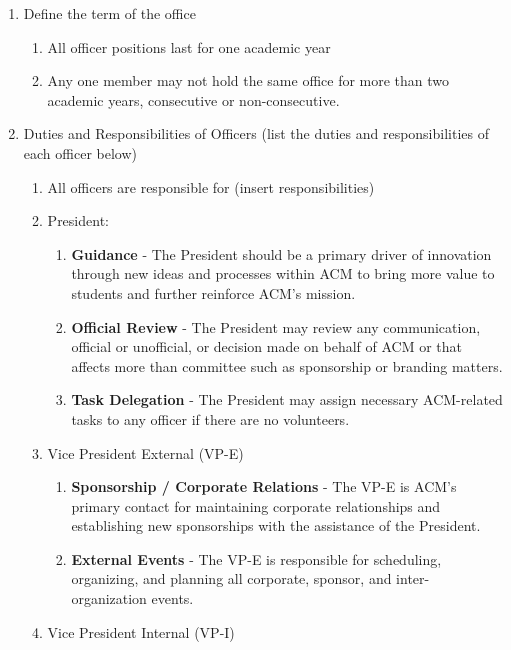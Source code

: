 \begin{enumerate}[label=\Alph*.]
  \item Define the term of the office
    \begin{enumerate}[label=\arabic*.]
      \item All officer positions last for one academic year
      \item Any one member may not hold the same office for more than two
      academic years, consecutive or non-consecutive.
    \end{enumerate}
  \item Duties and Responsibilities of Officers (list the duties and
  responsibilities of each officer below)
    \begin{enumerate}[label=\arabic*.]
      \item All officers are responsible for (insert responsibilities)
      \item President:
        \begin{enumerate}[label=\alph*.]
          \item \textbf{Guidance} - The President should be a primary driver of
            innovation through new ideas and processes within ACM to bring more
            value to students and further reinforce ACM's mission.
          \item \textbf{Official Review} - The President may review any
            communication, official or unofficial, or decision made on behalf of
            ACM or that affects more than committee such as sponsorship or
            branding matters.
          \item \textbf{Task Delegation} - The President may assign necessary
            ACM-related tasks to any officer if there are no volunteers.
        \end{enumerate}
      \item Vice President External (VP-E)
        \begin{enumerate}[label=\alph*.]
          \item \textbf{Sponsorship / Corporate Relations} - The VP-E is ACM's
            primary contact for maintaining corporate relationships and
            establishing new sponsorships with the assistance of the President. 
          \item \textbf{External Events} - The VP-E is responsible for
            scheduling, organizing, and planning all corporate, sponsor, and
            inter-organization events.
        \end{enumerate}
      \item Vice President Internal (VP-I)

\end{enumerate}
\end{enumerate}

